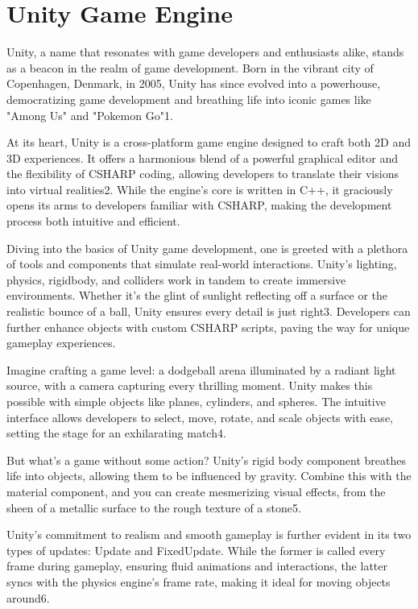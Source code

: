\section{Unity Game Engine}

Unity, a name that resonates with game developers and enthusiasts alike, stands as a beacon in the realm of game development. Born in the vibrant city of Copenhagen, Denmark, in 2005, Unity has since evolved into a powerhouse, democratizing game development and breathing life into iconic games like "Among Us" and "Pokemon Go"1.

At its heart, Unity is a cross-platform game engine designed to craft both 2D and 3D experiences. It offers a harmonious blend of a powerful graphical editor and the flexibility of CSHARP coding, allowing developers to translate their visions into virtual realities2. While the engine's core is written in C++, it graciously opens its arms to developers familiar with CSHARP, making the development process both intuitive and efficient.

Diving into the basics of Unity game development, one is greeted with a plethora of tools and components that simulate real-world interactions. Unity's lighting, physics, rigidbody, and colliders work in tandem to create immersive environments. Whether it's the glint of sunlight reflecting off a surface or the realistic bounce of a ball, Unity ensures every detail is just right3. Developers can further enhance objects with custom CSHARP scripts, paving the way for unique gameplay experiences.

Imagine crafting a game level: a dodgeball arena illuminated by a radiant light source, with a camera capturing every thrilling moment. Unity makes this possible with simple objects like planes, cylinders, and spheres. The intuitive interface allows developers to select, move, rotate, and scale objects with ease, setting the stage for an exhilarating match4.

But what's a game without some action? Unity's rigid body component breathes life into objects, allowing them to be influenced by gravity. Combine this with the material component, and you can create mesmerizing visual effects, from the sheen of a metallic surface to the rough texture of a stone5.

Unity's commitment to realism and smooth gameplay is further evident in its two types of updates: Update and FixedUpdate. While the former is called every frame during gameplay, ensuring fluid animations and interactions, the latter syncs with the physics engine's frame rate, making it ideal for moving objects around6.

